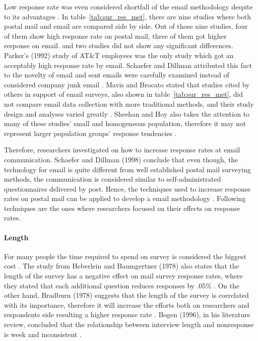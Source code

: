 Low response rate was even considered shortfall of the email methodology despite to its advantages \cite{BachmannD.ElfrinkJ.&Vazzana1999}. In table~\ref{tab:sur_res_met}, there are nine studies where both postal mail and email are compared side by side. Out of those nine studies, four of them show high response rate on postal mail, three of them got higher response on email. and two studies did not show any significant differences. Parker's (1992) study of AT\&T employees was the only study which got an acceptably high response rate by email. Schaefer and Dillman attributed this fact to the novelty of email and sent emails were carefully examined instead of considered company junk email \cite{Schaefer1998}. Mavis and Brocato stated that studies cited by others in support of email surveys, also shown in table~\ref{tab:sur_res_met}, did not compare email data collection with more traditional methods, and their study design and analyses varied greatly \cite{Mavis1998}. Sheehan and Hoy also takes the attention to many of these studies' small and homogeneous population, therefore it may not represent larger population groups' response tendencies \cite{Sheehan2006}.
\vspace{1cm}

Therefore, researchers investigated on how to increase response rates at email communication. Schaefer and Dillman (1998) conclude that even though, the technology for email is quite different from well established postal mail surveying methods, the communication is considered similar to self-administrated questionnaires delivered by post. Hence, the techniques used to increase response rates on postal mail can be applied to develop a email methodology \cite{Schaefer1998}. Following techniques are the ones where researchers focused on their effects on response rates.

\paragraph{Length}
For many people the time required to spend on survey is considered the biggest cost \cite[page 26]{DillmanDonA.SmythJoleneD.Christian2009}. The study from Heberlein and Baumgertner (1978) also states that the length of the survey has a negative effect on mail survey response rates, where they stated that each additional question reduces responses by .05\% \cite{Heberlein1978}. On the other hand, Bradburn (1978) suggests that the length of the survey is correlated with its importance, therefore it will increase the efforts both on researchers and respondents side resulting a higher response rate \cite{Bradburn1978}. Bogen (1996), in his literature review, concluded that the relationship between interview length and nonresponse is week and inconsistent \cite{Bogen1996}.

